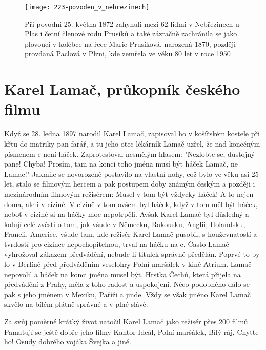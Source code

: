 \documentclass[../dejiny-rodu-prusiku.tex]{subfiles}
\begin{document}
\begin{figure}
\centering
\texttt{[image: 223-povoden\_v\_nebrezinech]}
\caption{Při povodni 25. května 1872 zahynuli mezi 62 lidmi v Nebřezinech u Plas i četní členové rodu Prusíků a také zázračně zachránila se jako plovoucí v kolébce na řece Marie Prusíková, narozená 1870, později provdaná Paclová v Plzni, kde zemřela ve věku 80 let v roce 1950}
\label{fig:223-povoden_v_nebrezinech}
\end{figure}


\section{Karel Lamač, průkopník českého filmu}

Když se 28. ledna 1897 narodil Karel Lamač, zapisoval ho v košířském kostele při křtu do matriky pan farář, a tu jeho otec lékárník Lamač uzřel, že nad konečným písmenem c není háček. Zaprotestoval nesmělým hlasem: "Nezlobte se, důstojný pane! Chyba! Prosím, tam na konci toho jména musí být háček Lamač, ne Lamac!" Jakmile se novorozeně postavilo na vlastní nohy, což bylo ve věku asi 25 let, stalo se filmovým hercem a pak postupem doby známým českým a později i meziná­rodním filmovým režisérem: Musel v tom být vždycky há­ček! A to nejen doma, ale i v cizině. V cizině v tom ovšem byl háček, když v tom měl být háček, neboť v ci­zině si na háčky moc nepotrpěli. Avšak Karel Lamač byl důsledný a kolují celé zvěsti o tom, jak všude v Německu, Rakousku, Anglii, Holandsku, Francii, Americe, všude tam, kde režisér Karel Lamač působil, s houževnatostí a tvrdostí pro cizince nepochopitelnou, trval na háčku na c. Často Lamač vyhrožoval zákazem předvá­dění, nebude-li titulek správně předělán. Poprvé to by­lo v Berlíně před předváděním veselohry Polní maršálek v kině Atrium. Lamač nepovolil a háček na konci jména musel být. Hrstka Čechů, která přijela na předvádění z Prahy, měla z toho radost a uspokojení. Něco podobné­ho dálo se pak s jeho jménem v Mexiku, Paříži a jinde. Vždy se však jméno Karel Lamač skvělo na bílém plátně správné a v plné slávě.

Za svůj poměrné krátký život natočil Karel Lamač jako režisér přes 200 filmů. Pamatují se ještě dobře jeho filmy Kantor Ideál, Polní maršálek, Bílý ráj, Chyťte ho! Osudy dobrého vojáka Švejka a jiné.
\end{document}
